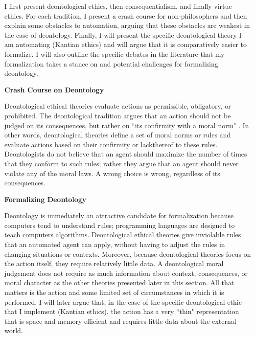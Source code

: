 \begin{isabellebody}
\begin{isamarkuptext}
I first present deontological ethics, then consequentialism, and finally virtue ethics. For each 
tradition, I present a crash course for non-philosophers and then explain some obstacles to automation, 
arguing that these obstacles are weakest in the case of deontology. Finally, I will present the specific 
deontological theory I am automating (Kantian ethics) and will argue that it is comparatively easier
to formalize. I will also outline the specific debates in the literature that my formalization takes
a stance on and potential challenges for formalizing deontology.%
\end{isamarkuptext}\isamarkuptrue%
%
\isadelimdocument
%
\endisadelimdocument
%
\isatagdocument
%
\isamarkuptrue%
%
\endisatagdocument
{\isafolddocument}%
%
\isadelimdocument
%
\endisadelimdocument
%
\begin{isamarkuptext}%
\textbf{Crash Course on Deontology}%
\end{isamarkuptext}\isamarkuptrue%
%
\begin{isamarkuptext}%
Deontological ethical theories evaluate actions as permissible, obligatory, or prohibited. The 
deontological tradition argues that an action should not be judged on its consequences, 
but rather on ``its confirmity with a moral norm" \citep{sepdeont}. In other words, deontological theories
define a set of moral norms or rules and evaluate actions based on their confirmity or lackthereof to
these rules. Deontologists do not believe that an agent should maximize the number of times that they 
conform to such rules; rather they argue that an agent should never violate any of the moral laws. A wrong
choice is wrong, regardless of its consequences.%
\end{isamarkuptext}\isamarkuptrue%
%
\begin{isamarkuptext}%
\textbf{Formalizing Deontology}%
\end{isamarkuptext}\isamarkuptrue%
%
\begin{isamarkuptext}%
Deontology is immediately an attractive candidate for formalization because computers tend to 
understand rules; programming languages are designed to teach computers algorithms. Deontological
ethical theories give inviolable rules that an automated agent can apply, without having to adjust
the rules in changing situations or contexts. Moreover, because deontological theories focus on
the action itself, they require relatively little data. A deontological moral judgement does not require
as much information about context, consequences, or moral character as the other theories presented later in this
section. All that matters is the action and some limited set of circumstances in which it is performed.
I will later argue that, in the case of the specific deontological ethic that I implement (Kantian ethics), 
the action has a very ``thin" representation that is space and memory efficient and requires little data
about the external world. 


\end{isamarkuptext}
\end{isabellebody}
